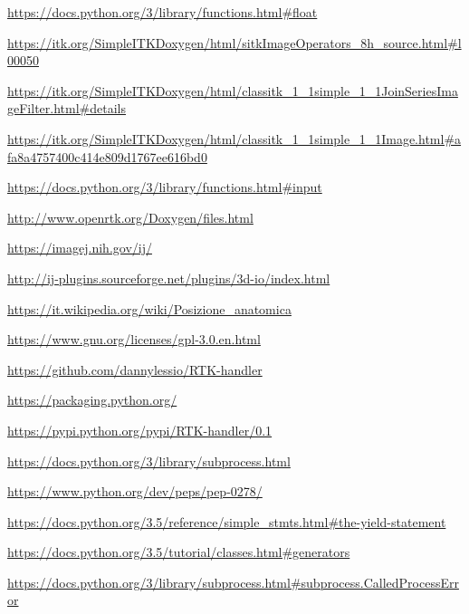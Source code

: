 \documentclass[a4paper,12pt, doubleside]{report}
\begin{document}
\begin{thebibliography}{1}
        \url{https://docs.python.org/3/library/functions.html#float}
    
        \url{https://itk.org/SimpleITKDoxygen/html/sitkImageOperators_8h_source.html#l00050}
    
        \url{https://itk.org/SimpleITKDoxygen/html/classitk_1_1simple_1_1JoinSeriesImageFilter.html#details}
    
        \url{https://itk.org/SimpleITKDoxygen/html/classitk_1_1simple_1_1Image.html#afa8a4757400c414e809d1767ee616bd0}

        \url{https://docs.python.org/3/library/functions.html#input}
        
        \url{http://www.openrtk.org/Doxygen/files.html}
    
        \url{https://imagej.nih.gov/ij/}
        
        \url{http://ij-plugins.sourceforge.net/plugins/3d-io/index.html}
        
        \url{https://it.wikipedia.org/wiki/Posizione_anatomica}



        \url{https://www.gnu.org/licenses/gpl-3.0.en.html}

        \url{https://github.com/dannylessio/RTK-handler}

        \url{https://packaging.python.org/}
        
        \url{https://pypi.python.org/pypi/RTK-handler/0.1}

        \url{https://docs.python.org/3/library/subprocess.html}    

        \url{https://www.python.org/dev/peps/pep-0278/}

        \url{https://docs.python.org/3.5/reference/simple_stmts.html#the-yield-statement}

        \url{https://docs.python.org/3.5/tutorial/classes.html#generators}

        \url{https://docs.python.org/3/library/subprocess.html#subprocess.CalledProcessError}


\end{thebibliography}
\end{document}
